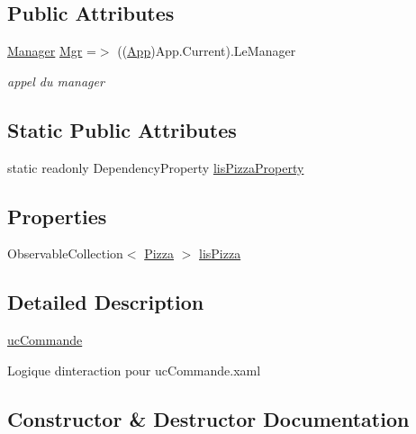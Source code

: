 \subsection*{Public Attributes}
\begin{DoxyCompactItemize}
\item 
\hyperlink{classModele_1_1Manager}{Manager} \hyperlink{classnewPizza1_1_1ucCommande_a5729f4554d2a1211716ccbb5179dfee3}{Mgr} =$>$ ((\hyperlink{classnewPizza1_1_1App}{App})App.\+Current).Le\+Manager
\begin{DoxyCompactList}\small\item\em appel du manager \end{DoxyCompactList}\end{DoxyCompactItemize}
\subsection*{Static Public Attributes}
\begin{DoxyCompactItemize}
\item 
static readonly Dependency\+Property \hyperlink{classnewPizza1_1_1ucCommande_a9cbd5cc0edb8769f5ff81c8e075b49e9}{lis\+Pizza\+Property}
\end{DoxyCompactItemize}
\subsection*{Properties}
\begin{DoxyCompactItemize}
\item 
Observable\+Collection$<$ \hyperlink{classModele_1_1Pizza}{Pizza} $>$ \hyperlink{classnewPizza1_1_1ucCommande_a836cce8453ff18e05badea0deaaec810}{lis\+Pizza}
\end{DoxyCompactItemize}


\subsection{Detailed Description}
\hyperlink{classnewPizza1_1_1ucCommande}{uc\+Commande} 

Logique d\textquotesingle{}interaction pour uc\+Commande.\+xaml 

\subsection{Constructor \& Destructor Documentation}
\mbox{\label{classnewPizza1_1_1ucCommande_a88406ed23ff1661dbb4645b407849445}} 
